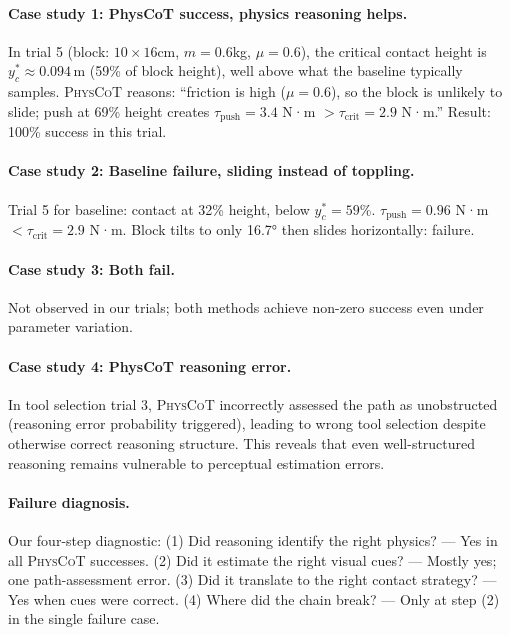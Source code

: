 \documentclass{article}
\newcommand{\physcot}{\textsc{PhysCoT}}
\begin{document}
\paragraph{Case study 1: PhysCoT success, physics reasoning helps.}
In trial 5 (block: $10\times16$cm, $m=0.6$kg, $\mu=0.6$),
the critical contact height is $y_c^* \approx 0.094\,\text{m}$
(59\% of block height), well above what the baseline typically samples.
\physcot{} reasons: ``friction is high ($\mu=0.6$), so the block is
unlikely to slide; push at 69\% height creates $\tau_\text{push} = 3.4$ N·m
$> \tau_\text{crit} = 2.9$ N·m.''
Result: 100\% success in this trial.

\paragraph{Case study 2: Baseline failure, sliding instead of toppling.}
Trial 5 for baseline: contact at 32\% height, below $y_c^* = 59\%$.
$\tau_\text{push} = 0.96$ N·m $< \tau_\text{crit} = 2.9$ N·m.
Block tilts to only 16.7° then slides horizontally: failure.

\paragraph{Case study 3: Both fail.}
Not observed in our trials; both methods achieve non-zero success
even under parameter variation.

\paragraph{Case study 4: PhysCoT reasoning error.}
In tool selection trial 3, \physcot{} incorrectly assessed the path
as unobstructed (reasoning error probability triggered),
leading to wrong tool selection despite otherwise correct reasoning structure.
This reveals that even well-structured reasoning remains vulnerable to
perceptual estimation errors.

\paragraph{Failure diagnosis.}
Our four-step diagnostic:
(1) Did reasoning identify the right physics? — Yes in all \physcot{} successes.
(2) Did it estimate the right visual cues? — Mostly yes; one path-assessment error.
(3) Did it translate to the right contact strategy? — Yes when cues were correct.
(4) Where did the chain break? — Only at step (2) in the single failure case.
\end{document}
